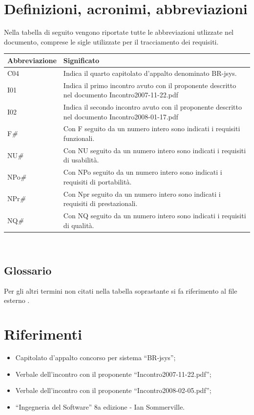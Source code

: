 \documentclass[11pt,titlepage,a4paper]{report}
\begin{document}
\section{Definizioni, acronimi, abbreviazioni}
Nella tabella di seguito vengono riportate tutte le abbreviazioni utlizzate nel documento, comprese le sigle utilizzate per il tracciamento dei requisiti.
\begin{center}
\begin{tabular}{||p{3.0cm}||p{8.5cm}||} \hline
\textbf{Abbreviazione} & \textbf{Significato} \\ \hline
C04 & Indica il quarto capitolato d'appalto denominato BR-jsys.\\ \hline
I01 & Indica il primo incontro avuto con il proponente descritto nel documento Incontro2007-11-22.pdf\\ \hline
I02 & Indica il secondo incontro avuto con il proponente descritto nel documento Incontro2008-01-17.pdf\\ \hline
F\textit{\#} & Con F seguito da un numero intero sono indicati i requisiti funzionali.\\ \hline
NU\textit{\#} & Con NU seguito da un numero intero sono indicati i requisiti di usabilit\`a.\\ \hline
NPo\textit{\#} & Con NPo seguito da un numero intero sono indicati i requisiti di portabilit\`a.\\ \hline
NPr\textit{\#} & Con Npr seguito da un numero intero sono indicati i requisiti di prestazionali.\\ \hline
NQ\textit{\#} & Con NQ seguito da un numero intero sono indicati i requisiti di qualit\`a.\\ \hline

\end{tabular} \\
\end{center}
\subsection{Glossario}
Per gli altri termini non citati nella tabella soprastante si fa riferimento al file esterno \Glossario .
\section{Riferimenti}
\begin{itemize}
\item Capitolato d'appalto concorso per sistema ``BR-jsys'';
\item Verbale dell'incontro con il proponente ``Incontro2007-11-22.pdf'';
\item Verbale dell'incontro con il proponente ``Incontro2008-02-05.pdf'';
\item ``Ingegneria del Software'' 8a edizione - Ian Sommerville.
\end{itemize}
\end{document}
